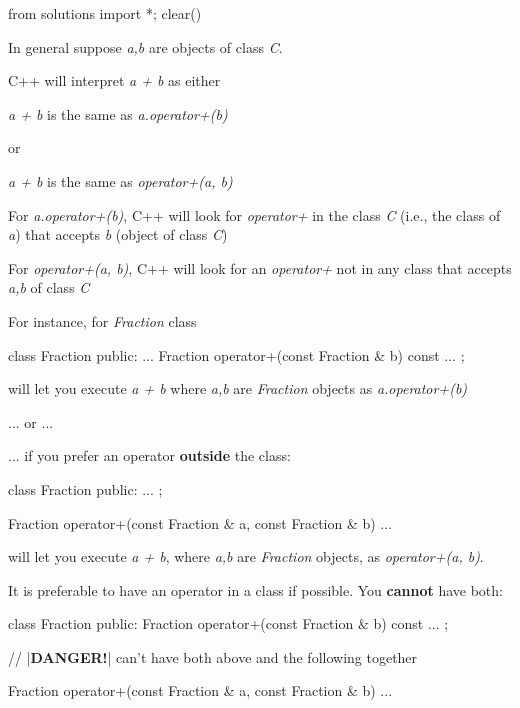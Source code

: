 \begin{python0}
from solutions import *; clear()
\end{python0}

In general suppose \textit{a,b} are objects of class \textit{C}.

C++ will interpret \textit{a + b} as either

\textit{a + b} is the same as \textit{a.operator+(b)}

or

\textit{a + b} is the same as \textit{operator+(a, b)}

For \textit{a.operator+(b)}, C++ will look for \textit{operator+} in the
class \textit{C} (i.e., the class of \textit{a}) that accepts \textit{b}
(object of class \textit{C})

For \textit{operator+(a, b)}, C++ will look for an \textit{operator+} not in
any class that accepts \textit{a,b} of class \textit{C}

For instance, for \textit{Fraction} class

\begin{consolethree}[escapeinside=||]
class Fraction
{
public:
    ...
    Fraction operator+(const Fraction & b) const {...}
};
\end{consolethree}

will let you execute \textit{a + b} where \textit{a,b} are \textit{Fraction}
objects as \textit{a.operator+(b)}

... or ...

... if you prefer an operator \textbf{outside} the class:

\begin{consolethree}[escapeinside=||]
class Fraction
{
public:
    ...
};

Fraction operator+(const Fraction & a, const Fraction & b)
{
    ...
}
\end{consolethree}

will let you execute \textit{a + b}, where \textit{a,b} are \textit{Fraction}
objects, as \textit{operator+(a, b)}.

It is preferable to have an operator in a class if possible. You
\textbf{cannot} have both:

\begin{consolethree}[escapeinside=||]
class Fraction
{
public:
    Fraction operator+(const Fraction & b) const
    {
        ...
    }
};

// |{\bf DANGER!}| can't have both above and the following together

Fraction operator+(const Fraction & a, const Fraction & b)
{
    ...
}
\end{consolethree}

